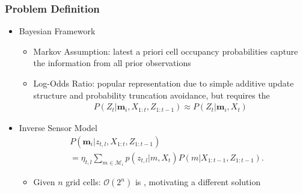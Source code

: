 \documentclass[11pt,professionalfonts,hyperref={pdftex,pdfpagemode=none,pdfstartview=FitH}]{beamer}
\renewcommand{\emph}[1]{\textit{\textbf{\color{blue}{#1}}}}
\begin{document}
\begin{frame}
\frametitle{Problem Definition}

\begin{itemize}
	\item Bayesian Framework
	\begin{itemize}
	\item Markov Assumption: latest a priori cell occupancy probabilities capture the information from all prior observations
	\item Log-Odds Ratio: popular representation due to simple additive update structure and probability truncation avoidance, but requires the \emph{assumption}
	\begin{align*}
		P(Z_t|\mathbf{m}_i,X_{1:t},Z_{1:t-1})\approx P(Z_t|\mathbf{m}_i,X_t)
	\end{align*}
	\end{itemize}
\vspace*{0.0cm}\pause
	\item Inverse Sensor Model
	\begin{align*}
&P(\mathbf{m}_i|z_{t,l},X_{1:t},Z_{1:t-1})\nonumber
\\
&=\eta_{t,l}\sum_{m\in\mathcal{M}_i}p(z_{t,l}|m,X_{t})P(m|X_{1:t-1},Z_{1:t-1}).
\end{align*}
	\begin{itemize}
	\item Given $n$ grid cells: $\mathcal O(2^n)$ is \emph{computationally intractable}, motivating a different solution
	\end{itemize}
\end{itemize}

\end{frame}
\end{document}
